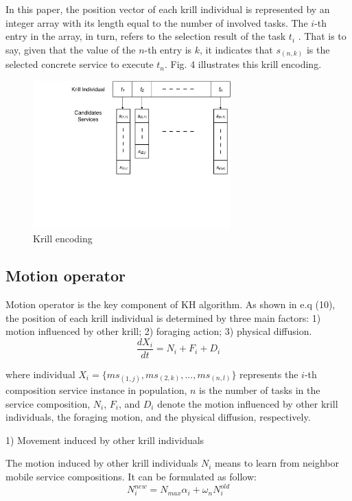 \documentclass[10pt,journal,compsoc]{IEEEtran}
\begin{document}
In this paper, the position vector of each krill individual is represented by an integer array with its length equal to the number of involved tasks. The $i$-th entry in the array, in turn, refers to the selection result of the task $t_i$ . That is to say, given that the value of the $n$-th entry is $k$, it indicates that $s_{(n,k)}$ is the selected concrete service to execute $t_n$. Fig. 4 illustrates this krill encoding.

\begin{figure}[!t]
\centering
\includegraphics[width=3in]{./img/pic4.pdf}
\caption{Krill encoding}
\label{Krill encoding}
\end{figure}


\subsection{Motion operator}
% 
% 

Motion operator is the key component of KH algorithm. As shown in e.q (10), the position of each krill individual is determined by three main factors: 1) motion influenced by other krill; 2) foraging action; 3) physical diffusion. 
\begin{equation}
\frac{dX_i}{dt} =N_i+F_i+D_i
\end{equation}

where individual $X_i = \{ms_{(1,j)}, ms_{(2,k)}, . . . , ms_{(n,l)}\}$ represents the $i$-th composition service instance in population, $n$ is the number of tasks in the service composition, $N_i$, $F_i$, and $D_i$ denote the motion influenced by other krill individuals, the foraging motion, and the physical diffusion, respectively.

1) Movement induced by other krill individuals

The motion induced by other krill individuals $N_i$ means to learn from neighbor mobile service compositions. It can be formulated as follow:
\begin{equation}
N^{new}_i = N_{max}\alpha_i + \omega_n N^{old}_i
\end{equation}
\end{document}
